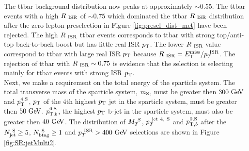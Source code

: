 \indent The ttbar background distribution now peaks at approximately $\sim 0.55$.  The ttbar events with a high $R_{~\mathrm{ISR}}$ of $\sim 0.75$ which dominated the ttbar $R_{~\mathrm{ISR}}$ distribution after the zero lepton preselection in Figure \ref{fig:presel_dist_met} have been rejected.  The high $R_{~\mathrm{ISR}}$ ttbar events corresponds to ttbar with strong top/anti-top back-to-back boost but has little real ISR $p_{\mathrm{T}}$.  The lower $R_{~\mathrm{ISR}}$ value correspond to ttbar with large real ISR $p_{\mathrm{T}}$ because $R_{~\mathrm{ISR}} = E_{\mathrm{T}}^{\mathrm{miss}}/p_{T}^{~\mathrm{ISR}}$.  The rejection of ttbar with $R_{~\mathrm{ISR}} \sim 0.75$ is evidence that the selection is selecting mainly for ttbar events with strong ISR $p_{\mathrm{T}}$.  \\ 



\indent Next, we make a requirement on the total energy of the sparticle system.  The total transverse mass of the sparticle system, $m_{\mathrm{S}}$, must be greater then $300 \gev$ and $p_{\mathrm{T}}^{4,\mathrm{S}}$, $p_{\mathrm{T}}$ of the 4th highest $p_{\mathrm{T}}$ jet in the sparticle system, must be greater then $50 \gev$.  $p_{\mathrm{T},b}^{0,\mathrm{S}}$, the highest $p_{\mathrm{T}}$ b-jet in the sparticle system, must also be greater then $40 \gev$.   The distribution of $M_{T}^{~S}$, $p_{T}^{~\mathrm{jet~4,~S}}$ and $p_{\mathrm{T},b}^{0,\mathrm{S}}$ after the $N_{\mathrm{jet}}^{~\mathrm{S}} \ge 5$, $N_{\mathrm{btag}}^{~\mathrm{S}} \ge 1$ and $\PTISR > 400 \gev$ selections are shown in Figure \ref{fig:SR:jetMulti2}. \\

